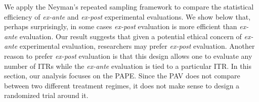 \documentclass[USenglish,onecolumn]{article}
\newcommand\bX{\bm{X}}
\newcommand\bZ{\bm{Z}}
\newtheorem{assumption}{Assumption}
\begin{document}
We apply the Neyman's repeated sampling framework to compare the
statistical efficiency of \textit{ex-ante} and {\it ex-post}
experimental evaluations.  We show below that, perhaps surprisingly,
in some cases \textit{ex-post} evaluation is more efficient than
\textit{ex-ante} evaluation.  Our result suggests that given a
potential ethical concern of {\it ex-ante} experimental evaluation,
researchers may prefer {\it ex-post} evaluation.  Another reason to
prefer {\it ex-post} evaluation is that this design allows one to
evaluate any number of ITRs while the {\it ex-ante} evaluation is tied
to a particular ITR. In this section, our analysis focuses on the
PAPE.  Since the PAV does not compare between two different treatment
regimes, it does not make sense to design a randomized trial around
it.
%
\end{document}
